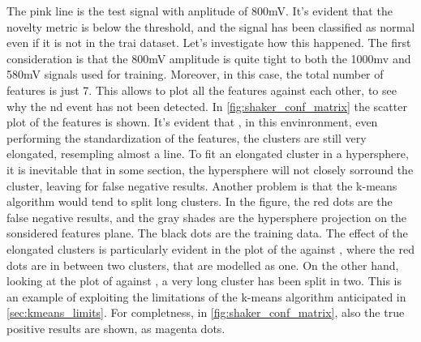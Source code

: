 The pink line is the test signal with anplitude of 800mV. It's evident that the novelty metric is below the threshold, and the signal has been classified as normal even if it is not in the trai dataset. Let's investigate how this happened. The first consideration is that the 800mV amplitude is quite tight to both the 1000mv and 580mV signals used for training. Moreover, in this case, the total number of features is just 7. This allows to plot all the features against each other, to see why the \gls{nd} event has not been detected. In \autoref{fig:shaker_conf_matrix} the scatter plot of the features is shown. It's evident that , in this envinronment, even performing the standardization of the features, the clusters are still very elongated, resempling almost a line. To fit an elongated cluster in a hypersphere, it is inevitable that in some section, the hypersphere will not closely sorround the cluster, leaving  for false negative results. Another problem is that the k-means algorithm would tend to split long clusters. In the figure, the red dots are the false negative results, and the gray shades are the hypersphere projection on the sonsidered features plane. The black dots are the training data. The effect of the elongated clusters is particularly evident in the plot of the  against , where the red dots are in between two clusters, that are modelled as one. On the other hand, looking at the plot of  against , a very long cluster has been split in two. This is an example of exploiting the limitations of the k-means algorithm anticipated in \autoref{sec:kmeans_limits}. 
For completness, in \autoref{fig:shaker_conf_matrix}, also the true positive results are shown, as magenta dots.


